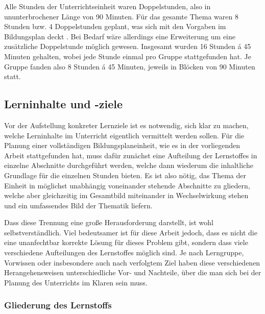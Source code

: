 Alle Stunden der Unterrichtseinheit waren Doppelstunden, also in ununterbrochener Länge von 90 Minuten.
Für das gesamte Thema waren 8 Stunden bzw. 4 Doppelstunden geplant, was sich mit den Vorgaben im Bildungsplan deckt \cite[BPE~19]{bildungsplan-tg-informatik}.
Bei Bedarf wäre allerdings eine Erweiterung um eine zusätzliche Doppelstunde möglich gewesen.
Insgesamt wurden 16 Stunden \'a 45 Minuten gehalten, wobei jede Stunde einmal pro Gruppe stattgefunden hat.
Je Gruppe fanden also 8 Stunden \'a 45 Minuten, jeweils in Blöcken von 90 Minuten statt.


\subsection{Lerninhalte und -ziele}
\label{subsec:lernziele}

Vor der Aufstellung konkreter Lernziele ist es notwendig, sich klar zu machen, welche Lerninhalte im Unterricht eigentlich vermittelt werden sollen.
Für die Planung einer vollständigen Bildungsplaneinheit, wie es in der vorliegenden Arbeit stattgefunden hat, muss dafür zunächst eine Aufteilung der Lernstoffes in einzelne Abschnitte durchgeführt werden, welche dann wiederum die inhaltliche Grundlage für die einzelnen Stunden bieten.
Es ist also nötig, das Thema der Einheit in möglichst unabhängig voneinander stehende Abschnitte zu gliedern, welche aber gleichzeitig im Gesamtbild miteinander in Wechselwirkung stehen und ein umfassendes Bild der Thematik liefern.

Dass diese Trennung eine große Herausforderung darstellt, ist wohl selbstverständlich.
Viel bedeutsamer ist für diese Arbeit jedoch, dass es nicht die eine unanfechtbar korrekte Lösung für dieses Problem gibt, sondern dass viele verschiedene Aufteilungen des Lernstoffes möglich sind.
Je nach Lerngruppe, Vorwissen oder insbesondere auch nach verfolgtem Ziel haben diese verschiedenen Herangehensweisen unterschiedliche Vor- und Nachteile, über die man sich bei der Planung des Unterrichts im Klaren sein muss.


\subsubsection{Gliederung des Lernstoffs}
\label{subsubsec:lernstoff-gliederung}

